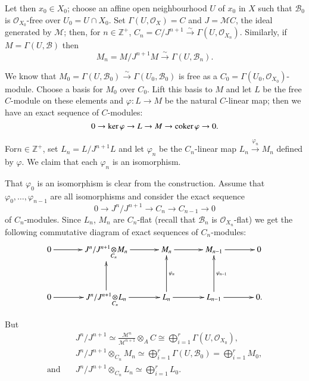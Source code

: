 Let then $x_{0}\in X_{0}$; choose an affine open neighbourhood $U$ of
$x_{0}$ in $X$ such that $\mathscr{B}_{0}$ is
$\mathscr{O}_{X_{0}}$-free over $U_{0}=U\cap X_{0}$. Set
$\Gamma(U,\mathscr{O}_{X})=C$ and $J=\mathscr{M}C$, the ideal
generated by $\mathscr{M}$; then, for $n\in\mathbb{Z}^{+}$,
$C_{n}=C/J^{n+1}\xrightarrow{\sim}\Gamma(U,\mathscr{O}_{X_{n}})$. Similarly,
if $M=\Gamma(U,\mathscr{B})$ then
$$
M_{n}=M/J^{n+1}M\xrightarrow{\sim}\Gamma(U,\mathscr{B}_{n}). 
$$

We know that
$M_{0}=\Gamma(U,\mathscr{B}_{0})\xrightarrow{\sim}\Gamma(U_{0},\mathscr{B}_{0})$
is free as a $C_{0}=\Gamma(U_{0},\mathscr{O}_{X_{0}})$-module. Choose
a basis for $M_{0}$ over $C_{0}$. Lift this basis to $M$ and let $L$
be the free $C$-module on these elements and $\varphi:L\to M$ be the
natural $C$-linear map; then we have an exact sequence of $C$-modules:
$$
0\to \ker\varphi\to L\to M\to \operatorname{coker}\varphi\to 0.
$$

For\pageoriginale $n\in\mathbb{Z}^{+}$, set $L_{n}=L/J^{n+1}L$ and let
$\varphi_{n}$ be the $C_{n}$-linear map
$L_{n}\xrightarrow{\varphi_{n}}M_{n}$ defined by $\varphi$. We claim
that each $\varphi_{n}$ is an isomorphism.

That $\varphi_{0}$ is an isomorphism is clear from the
construction. Assume that $\varphi_{0},\ldots,\varphi_{n-1}$ are all
isomorphisms and consider the exact sequence
$$
0\to {J^{n}}/J^{n+1}\to C_{n}\to C_{n-1}\to 0
$$
of $C_{n}$-modules. Since $L_{n}$, $M_{n}$ are $C_{n}$-flat (recall
that $\mathscr{B}_{n}$ is $\mathscr{O}_{X_{n}}$-flat) we get the
following commutative diagram of exact sequences of $C_{n}$-modules:
\[
\xymatrix@=1.2cm{
0\ar[r] & \foprod{J^{n}/J^{n+1}}{M_{n}}{C_{n}}\ar[r] & M_{n}\ar[r] &
M_{n-1}\ar[r] & 0\\
0\ar[r] & \foprod{J^{n}/J^{n+1}}{L_{n}}{C_{n}}\ar[r]\ar[u] &
L_{n}\ar[r]\ar[u]_{\varphi_{n}} & L_{n-1}\ar[r]\ar[u]_{\varphi_{n-1}} & 0.
}
\]

But
\begin{align*}
& J^{n}/J^{n+1}\simeq
  \frac{\mathscr{M}^{n}}{\mathscr{M}^{n+1}}\mathop{\otimes}_{A}C\cong
  \bigoplus^{r}_{i=1}\Gamma(U,\mathscr{O}_{X_{0}}),\\[4pt]
& J^{n}/J^{n+1}\mathop{\otimes}_{C_{n}}M_{n}\simeq
  \bigoplus^{r}_{i=1}\Gamma(U,\mathscr{B}_{0})=\bigoplus^{r}_{i=1}M_{0},\\[4pt]
\text{and}\quad & J^{n}/J^{n+1}\mathop{\otimes}_{C_{n}}L_{n}\simeq
\bigoplus^{r}_{i=1}L_{0}.
\end{align*}

